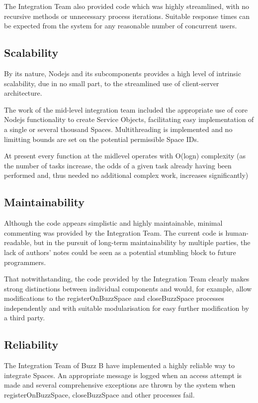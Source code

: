 \documentclass[12pt]{article}
\begin{document}
The Integration Team also provided code which was highly streamlined, with no recursive methods or unnecessary process iterations. Suitable response times can be expected from the system for any reasonable number of concurrent users.

\subsection{Scalability}
By its nature, Nodejs and its subcomponents provides a high level of intrinsic scalability, due in no small part, to the streamlined use of client-server architecture. 

The work of the mid-level integration team included the appropriate use of core Nodejs functionality to create Service Objects, facilitating easy implementation of a single or several thousand Spaces. Multithreading is implemented and no limitting bounds are set on the potential permissible Space IDs.

At present every function at the midlevel operates with O(logn) complexity (as the number of tasks increase, the odds of a given task already having been performed and, thus needed no additional complex work, increases significantly) 

\subsection{Maintainability}
Although the code appears simplistic and highly maintainable, minimal commenting was provided by the Integration Team. The current code is human-readable, but in the pursuit of long-term maintainability by multiple parties, the lack of authors’ notes could be seen as a potential stumbling block to future programmers.

That notwithstanding, the code provided by the Integration Team clearly makes strong distinctions between individual components and would, for example, allow modifications to the registerOnBuzzSpace and closeBuzzSpace processes independently and with suitable modularisation for easy further modification by a third party.

\subsection{Reliability}
The Integration Team of Buzz B have implemented a highly reliable way to integrate Spaces. An appropriate message is logged when an access attempt is made and several comprehensive exceptions are thrown by the system when registerOnBuzzSpace, closeBuzzSpace and other processes fail.
\end{document}
